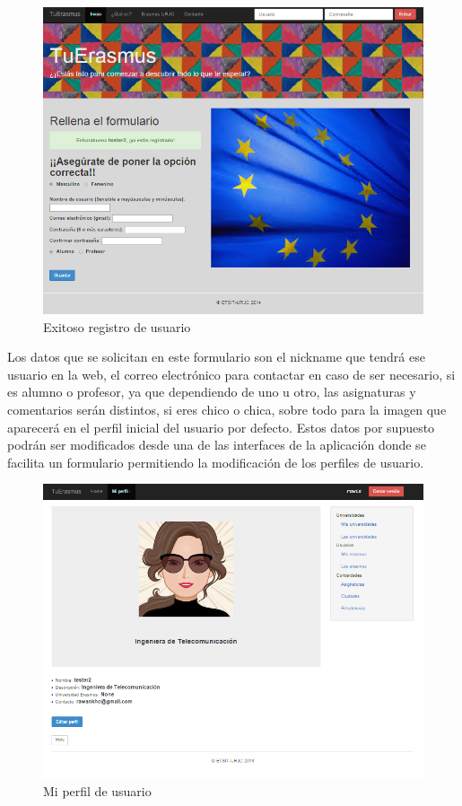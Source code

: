 \begin{figure}[htbp]
	
	\centering
	\includegraphics[scale=0.5]{./Figuras/tuerasmusPages/publicPages/successRegister.png}
	\caption{Exitoso registro de usuario}
	\label{fig:sucRegUsu}
	
\end{figure}

Los datos que se solicitan en este formulario son el nickname que tendr\'a ese usuario en la web, el correo electr\'onico para contactar en caso de ser necesario, si es alumno o profesor, ya que dependiendo de uno u otro, las asignaturas y comentarios ser\'an distintos, si eres chico o chica, sobre todo para la imagen que aparecer\'a en el perfil inicial del usuario por defecto. Estos datos por supuesto podr\'an ser modificados desde una de las interfaces de la aplicaci\'on donde se facilita un formulario permitiendo la modificaci\'on de los perfiles de usuario.\\

\begin{figure}[htbp]
	
	\centering
	\includegraphics[scale=0.5]{./Figuras/tuerasmusPages/privatePages/myProfile.png}
	\caption{Mi perfil de usuario}
	\label{fig:profUsu}
	
\end{figure}


